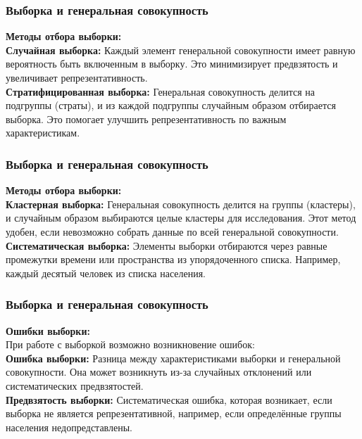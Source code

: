 \documentclass[aspectratio=169]{beamer}
\begin{document}
\begin{frame}
\frametitle{Выборка и генеральная совокупность}
\textbf{Методы отбора выборки:}
\newline\\
\textbf{Случайная выборка:} Каждый элемент генеральной совокупности имеет равную вероятность быть включенным в выборку. Это минимизирует предвзятость и увеличивает репрезентативность.
\newline\\
\textbf{Стратифицированная выборка:} Генеральная совокупность делится на подгруппы (страты), и из каждой подгруппы случайным образом отбирается выборка. Это помогает улучшить репрезентативность по важным характеристикам.
\end{frame}

\begin{frame}
\frametitle{Выборка и генеральная совокупность}
\textbf{Методы отбора выборки:}
\newline\\
\textbf{Кластерная выборка:} Генеральная совокупность делится на группы (кластеры), и случайным образом выбираются целые кластеры для исследования. Этот метод удобен, если невозможно собрать данные по всей генеральной совокупности.
\newline\\
\textbf{Систематическая выборка:} Элементы выборки отбираются через равные промежутки времени или пространства из упорядоченного списка. Например, каждый десятый человек из списка населения.
\end{frame}

\begin{frame}
\frametitle{Выборка и генеральная совокупность}
\textbf{Ошибки выборки:}
\newline\\
При работе с выборкой возможно возникновение ошибок:
\newline\\
\textbf{Ошибка выборки:} Разница между характеристиками выборки и генеральной совокупности. Она может возникнуть из-за случайных отклонений или систематических предвзятостей.
\newline\\
\textbf{Предвзятость выборки:} Систематическая ошибка, которая возникает, если выборка не является репрезентативной, например, если определённые группы населения недопредставлены.
\end{frame}
\end{document}
